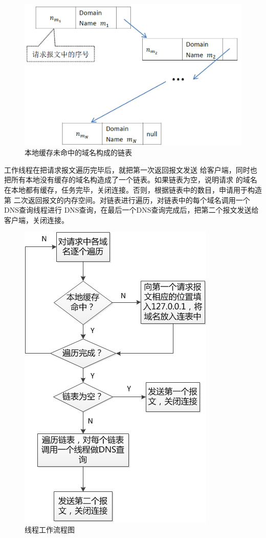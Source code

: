 \begin{figure}[H]
\centering
\includegraphics[keepaspectratio, scale=0.5]{pitures/response2_dns_list.png}
\caption{本地缓存未命中的域名构成的链表} 
\end{figure}

\par{工作线程在把请求报文遍历完毕后，就把第一次返回报文发送
给客户端，同时也把所有本地没有缓存的域名构造成了一个链表。如果链表为空，说明请求
的域名在本地都有缓存，任务完毕，关闭连接。否则，根据链表中的数目，申请用于构造第
二次返回报文的内存空间。对链表进行遍历，对链表中的每个域名调用一个DNS查询线程进行
DNS查询，在最后一个DNS查询完成后，把第二个报文发送给客户端，关闭连接。}

\begin{figure}[H]
\centering
\includegraphics[keepaspectratio, scale=1]{pitures/xianchengliuchengtu.png}
\caption{线程工作流程图} 
\end{figure}


